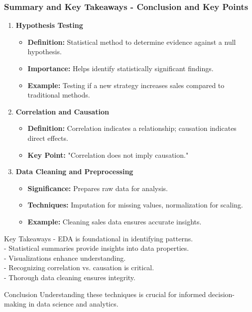 \documentclass[aspectratio=169]{beamer}
\begin{document}
\begin{frame}[fragile]
    \frametitle{Summary and Key Takeaways - Conclusion and Key Points}
    \begin{enumerate}
        \item \textbf{Hypothesis Testing}
            \begin{itemize}
                \item \textbf{Definition:} Statistical method to determine evidence against a null hypothesis.
                \item \textbf{Importance:} Helps identify statistically significant findings.
                \item \textbf{Example:} Testing if a new strategy increases sales compared to traditional methods.
            \end{itemize}

        \item \textbf{Correlation and Causation}
            \begin{itemize}
                \item \textbf{Definition:} Correlation indicates a relationship; causation indicates direct effects.
                \item \textbf{Key Point:} "Correlation does not imply causation."
            \end{itemize}

        \item \textbf{Data Cleaning and Preprocessing}
            \begin{itemize}
                \item \textbf{Significance:} Prepares raw data for analysis.
                \item \textbf{Techniques:} Imputation for missing values, normalization for scaling.
                \item \textbf{Example:} Cleaning sales data ensures accurate insights.
            \end{itemize}
    \end{enumerate}

    \begin{block}{Key Takeaways}
        - EDA is foundational in identifying patterns.\\
        - Statistical summaries provide insights into data properties.\\
        - Visualizations enhance understanding.\\
        - Recognizing correlation vs. causation is critical.\\
        - Thorough data cleaning ensures integrity.
    \end{block}

    \begin{block}{Conclusion}
        Understanding these techniques is crucial for informed decision-making in data science and analytics.
    \end{block}
\end{frame}
\end{document}
